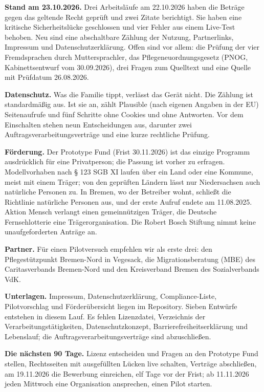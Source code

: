 \documentclass[10pt,parskip=half-]{scrartcl}
\begin{document}
\textbf{Stand am 23.10.2026.} Drei Arbeitsläufe am 22.10.2026 haben die Beträge gegen das
geltende Recht geprüft und zwei Zitate berichtigt. Sie haben eine kritische Sicherheitslücke
geschlossen und vier Fehler aus einem Live-Test behoben. Neu sind eine abschaltbare Zählung der
Nutzung, Partnerlinks, Impressum und Datenschutzerklärung. Offen sind vor allem: die Prüfung der vier
Fremdsprachen durch Muttersprachler, das Pflegeneuordnungsgesetz (PNOG, Kabinettsentwurf vom
30.09.2026), drei Fragen zum Quelltext und eine Quelle mit Prüfdatum 26.08.2026.

\textbf{Datenschutz.} Was die Familie tippt, verlässt das Gerät nicht. Die Zählung ist
standardmäßig aus. Ist sie an, zählt Plausible (nach eigenen Angaben in der EU) Seitenaufrufe
und fünf Schritte ohne Cookies und ohne Antworten. Vor dem Einschalten stehen neun
Entscheidungen aus, darunter zwei Auftragsverarbeitungsverträge und eine kurze rechtliche
Prüfung.

\textbf{Förderung.} Der Prototype Fund (Frist 30.11.2026) ist das einzige Programm ausdrücklich
für eine Privatperson; die Passung ist vorher zu erfragen. Modellvorhaben nach § 123 SGB XI
laufen über ein Land oder eine Kommune, meist mit einem Träger; von den geprüften Ländern lässt
nur Niedersachsen auch natürliche Personen zu. In Bremen, wo der Betreiber wohnt, schließt die
Richtlinie natürliche Personen aus, und der erste Aufruf endete am 11.08.2025. Aktion Mensch verlangt einen gemeinnützigen Träger, die Deutsche
Fernsehlotterie eine Trägerorganisation. Die Robert Bosch Stiftung nimmt keine
unaufgeforderten Anträge an.

\textbf{Partner.} Für einen Pilotversuch empfehlen wir als erste drei: den Pflegestützpunkt
Bremen-Nord in Vegesack, die Migrationsberatung (MBE) des Caritasverbands Bremen-Nord und den
Kreisverband Bremen des Sozialverbands VdK.

\textbf{Unterlagen.} Impressum, Datenschutzerklärung, Compliance-Liste, Pilotvorschlag und
Förderübersicht liegen im Repository. Sieben Entwürfe entstehen in diesem Lauf. Es fehlen
Lizenzdatei, Verzeichnis der Verarbeitungstätigkeiten, Datenschutzkonzept,
Barrierefreiheitserklärung und Lebenslauf; die Auftragsverarbeitungsverträge sind
abzuschließen.

\textbf{Die nächsten 90 Tage.} Lizenz entscheiden und Fragen an den Prototype Fund stellen,
Rechtsseiten mit ausgefüllten Lücken live schalten, Verträge abschließen, am 19.11.2026 die
Bewerbung einreichen, elf Tage vor der Frist; ab 11.11.2026 jeden Mittwoch eine Organisation
ansprechen, einen Pilot starten.
\end{document}
